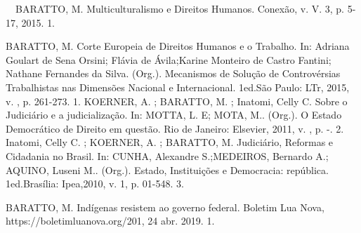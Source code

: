 

\begin{cvhonors}
  \cvhonor
    {\faStar~~BARATTO, M.}
    {Multiculturalismo e Direitos Humanos. Conexão, v. V. 3, p. 5-17, 2015.}
    {}
    {1. }
\end{cvhonors}



\begin{cvhonors}
  \cvhonor
    {BARATTO, M.}
    {Corte Europeia de Direitos Humanos e o Trabalho. In: Adriana Goulart de Sena Orsini; Flávia de Ávila;Karine Monteiro de Castro Fantini; Nathane Fernandes da Silva. (Org.). Mecanismos de Solução de Controvérsias Trabalhistas nas Dimensões Nacional e Internacional. 1ed.São Paulo: LTr, 2015, v. , p. 261-273.}
    {}
    {1. }
  \cvhonor
    {KOERNER, A. ; BARATTO, M. ; Inatomi, Celly C.}
    {Sobre o Judiciário e a judicialização. In: MOTTA, L. E; MOTA, M.. (Org.).
   O Estado Democrático de Direito em questão. Rio de Janeiro: Elsevier, 2011, v. , p. -.}
    {}
    {2. }
  \cvhonor
    {Inatomi, Celly C. ; KOERNER, A. ; BARATTO, M.}
    {Judiciário, Reformas e Cidadania no Brasil. In: CUNHA, Alexandre S.;MEDEIROS, Bernardo A.; AQUINO, Luseni M.. (Org.). Estado, Instituições e Democracia: república. 1ed.Brasília: Ipea,2010, v. 1, p. 01-548.}
    {}
    {3. }
\end{cvhonors}


\begin{cvhonors}
  \cvhonor
    {BARATTO, M.}
    {Indígenas resistem ao governo federal. Boletim Lua Nova, https://boletimluanova.org/201, 24 abr. 2019.}
    {}
    {1. }
\end{cvhonors}
\pagebreak
{}

